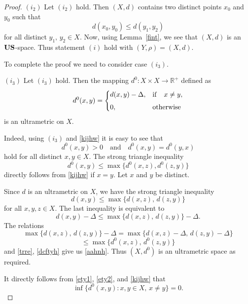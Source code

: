\documentclass[11pt]{article}
\theoremstyle{definition}
\theoremstyle{remark}
\numberwithin{equation}{section}
\begin{document}
\begin{proof}
$(i_2)$ Let $(i_2)$ hold. Then \((X,d)\) 
contains two distinct points 
 $x_0$ and $y_0$ such that
\begin{equation}
    \label{qq1}
d(x_0,y_0) \leq d(y_1,y_2)
\end{equation}
 for all distinct $y_1,\,y_2\in X$. Now, using Lemma~\ref{fint}, we see that  $(X,d)$ is an $\bf US$-space. Thus statement $(i)$ hold with $(Y,\rho)= (X,d)$.   



To complete the proof we need to consider  case  $(i_3)$.

$(i_3)$ Let $(i_3)$ hold. Then the mapping $d^0:X\times X\to\mathbb{R}^+$ defined as 
\begin{equation}
    \label{kijhw}
d^0(x,y)=
\begin{cases}
d(x,y)-\Delta,& {\rm if} \quad x\neq y,\\[4pt]
0,& {\rm otherwise}
\end{cases}
\end{equation}
is an 
 ultrametric on $X$.


Indeed, using $(i_3)$ and \eqref{kijhw} it is easy to see that
\[
d^{0}(x,y) > 0 \quad \text{and} \quad d^{0}(x,y) = d^{0}(y,x)
\]
hold for all distinct $x,y \in X$.  The strong triangle inequality 
\begin{equation}
    \label{aahnh}
    d^0(x,y)\leq \max \{d^0(x,z),d^0(z,y)\}
\end{equation}
directly follows from \eqref{kijhw} if $x=y$. Let $x$ and $y$ be distinct.


Since $d$ is an ultrametric on $X$, we have the strong triangle inequality
\begin{equation}
    \label{trre}
d(x,y) \leq \max\{ d(x,z),\, d(z,y) \}
\end{equation}
for all $x,y,z \in X$. The last inequality is equivalent to
\begin{equation}\label{dcftyh}
d(x,y) - \Delta \leq \max\{ d(x,z),\, d(z,y) \} - \Delta. 
\end{equation}
The relations  
\[
\max \{ d(x,z),\, d(z,y)\} - \Delta 
= \max \{ d(x,z) - \Delta,\, d(z,y) - \Delta \}
\]
\[
\leq\max \{ d^0(x,z),\, d^0(z,y) \}
\]
and \eqref{trre}, \eqref{dcftyh} give us \eqref{aahnh}.
Thus $(X,d^0)$ is an ultrametric space as required.

It directly follows from \eqref{ety1}, \eqref{ety2}, and \eqref{kijhw} that
\begin{equation}
    \label{w1}
\inf \{ d^0(x,y) : x,y \in X,\, x \neq y \} = 0. 
\end{equation}


\end{proof}
\end{document}
